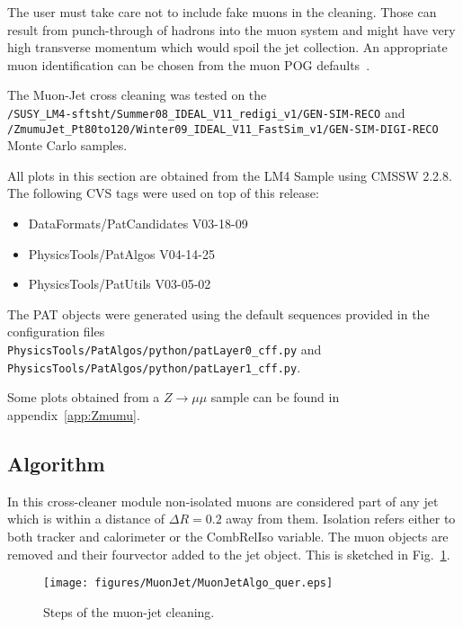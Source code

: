 \documentclass{cmspaper}
\begin{document}
The user must take care not to include fake muons in the cleaning. Those can
result from punch-through of hadrons into the muon system and might have very
high transverse momentum which would spoil the jet collection. An appropriate
muon identification can be chosen from the muon POG defaults~\cite{muonID}.

The Muon-Jet cross cleaning was tested on the\\
\texttt{/SUSY\_LM4-sftsht/Summer08\_IDEAL\_V11\_redigi\_v1/GEN-SIM-RECO} and\\
\texttt{/ZmumuJet\_Pt80to120/Winter09\_IDEAL\_V11\_FastSim\_v1/GEN-SIM-DIGI-RECO}
Monte Carlo samples.

All plots in this section are obtained from the LM4 Sample using CMSSW 2.2.8.
The following CVS tags were used on top of this release:
\begin{itemize}
    \item DataFormats/PatCandidates V03-18-09      
    \item PhysicsTools/PatAlgos     V04-14-25      
    \item PhysicsTools/PatUtils     V03-05-02      
\end{itemize}
The PAT objects
were generated using the default sequences provided in the configuration
files\\
\texttt{PhysicsTools/PatAlgos/python/patLayer0\_cff.py} and\\
\texttt{PhysicsTools/PatAlgos/python/patLayer1\_cff.py}.

Some plots obtained from a $Z\rightarrow\mu\mu$ sample can be found in appendix~\ref{app:Zmumu}.


\subsection{Algorithm}
In this cross-cleaner module non-isolated muons are considered part of
any jet which is within a distance of $\Delta R=0.2$ away from them. Isolation refers either
to both tracker and calorimeter or the CombRelIso variable. The muon objects
are removed and their fourvector added to the jet object. 
This is sketched in Fig.~\ref{fig:MJCleaning}.

\begin{figure}[hbt]
\begin{center}
\texttt{[image: figures/MuonJet/MuonJetAlgo\_quer.eps]}
\caption{Steps of the muon-jet cleaning.}
\label{fig:MJCleaning}
\end{center}
\end{figure}
\end{document}
